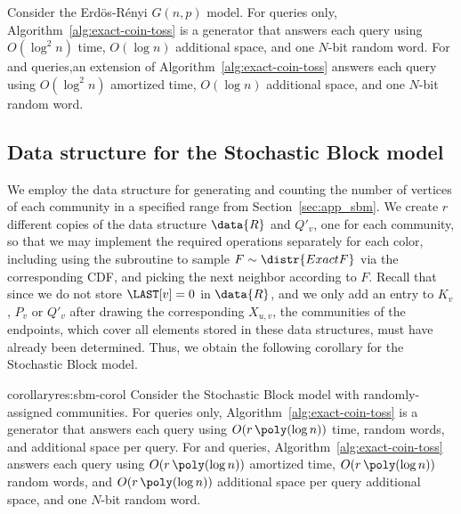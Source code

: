 \begin{theorem}
Consider the Erd\"{o}s-R\'{e}nyi $G(n,p)$ model. For  queries only, Algorithm~\ref{alg:exact-coin-toss} is a generator that answers each query using $O(\log^2 n)$ time, $O(\log n)$ additional space, and one $N$-bit random word. For  and  queries,an extension of Algorithm~\ref{alg:exact-coin-toss} answers each query using $O(\log^2 n)$ amortized time, $O(\log n)$ additional space, and one $N$-bit random word.
\end{theorem}

\subsection{Data structure for the Stochastic Block model}\label{sec:det-sbm}

We employ the data structure for generating and counting the number of vertices of each community in a specified range from Section~\ref{sec:app_sbm}. We create $r$ different copies of the data structure $\data{R}$ and $Q'_v$, one for each community, so that we may implement the required operations separately for each color, including using the  subroutine to sample $F\sim\distr{ExactF}$ via the corresponding CDF, and picking the next neighbor according to $F$. Recall that since we do not store $\LAST[v] = 0$ in $\data{R}$, and we only add an entry to $K_v$, $P_v$ or $Q'_v$ after drawing the corresponding $X_{u,v}$, the communities of the endpoints, which cover all elements stored in these data structures, must have already been determined. Thus, we obtain the following corollary for the Stochastic Block model.

\begin{restatable}{corollary}{res:sbm-corol}
Consider the Stochastic Block model with randomly-assigned communities. For  queries only, Algorithm~\ref{alg:exact-coin-toss} is a generator that answers each query using $O(r\,\poly(\log n))$ time, random words, and additional space per query. For  and  queries, Algorithm~\ref{alg:exact-coin-toss} answers each query using $O(r\,\poly(\log n))$ amortized time, $O(r\,\poly(\log n))$ random words, and $O(r\,\poly(\log n))$ additional space per query additional space, and one $N$-bit random word.
\end{restatable}

